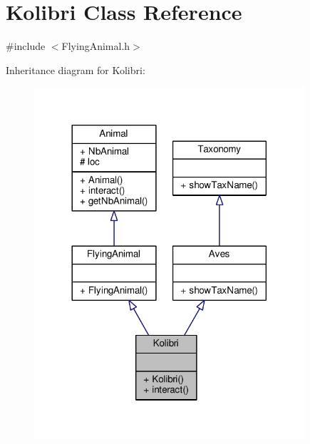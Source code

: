 \hypertarget{classKolibri}{}\section{Kolibri Class Reference}
\label{classKolibri}


{\ttfamily \#include $<$Flying\+Animal.\+h$>$}



Inheritance diagram for Kolibri\+:
\nopagebreak
\begin{figure}[H]
\begin{center}
\leavevmode
\includegraphics[width=284pt]{classKolibri__inherit__graph}
\end{center}
\end{figure}


